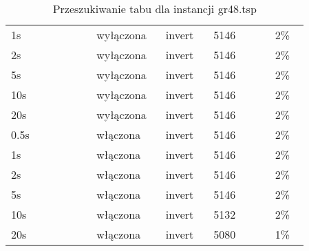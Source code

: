 \documentclass[12pt,a4paper,titlepage]{article}
\begin{document}
\begin{table}[H]
{\begin{tabular}{|p{0.25\linewidth}p{0.19\linewidth}p{0.14\linewidth}p{0.18\linewidth}p{0.1\linewidth}|}
        1s & wyłączona & invert & 5146 & 2\% \\
        2s & wyłączona & invert & 5146 & 2\% \\
        5s & wyłączona & invert & 5146 & 2\% \\
        10s & wyłączona & invert & 5146 & 2\% \\
        20s & wyłączona & invert & 5146 & 2\% \\
        \hline
        0.5s & włączona & invert & 5146 & 2\% \\
        1s & włączona & invert & 5146 & 2\% \\
        2s & włączona & invert & 5146 & 2\% \\
        5s & włączona & invert & 5146 & 2\% \\
        10s & włączona & invert & 5132 & 2\% \\
        20s & włączona & invert & 5080 & 1\% \\
        \hline
	\end{tabular}}
	\caption{Przeszukiwanie tabu dla instancji gr48.tsp}
\end{table}
\end{document}
